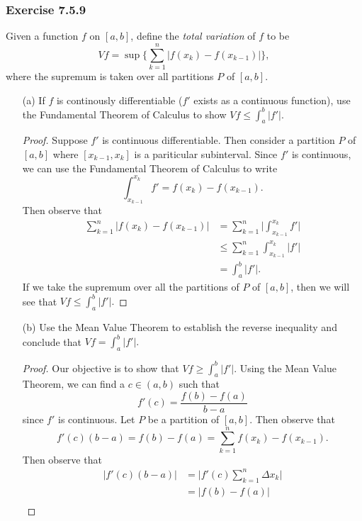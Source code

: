 \subsubsection{Exercise 7.5.9} Given a function \( f  \) on \( [a,b]  \), define the \textit{total variation} of \( f  \) to be 
\[  Vf = \sup \Bigg\{ \sum_{ k=1 }^{ n } | f(x_{k}) - f(x_{k-1}) |  \Bigg\},  \]
where the supremum is taken over all partitions \( P  \) of \( [a,b] \).
\begin{enumerate}
    \item[(a)] If \( f  \) is continously differentiable (\( f' \) exists as a continuous function), use the Fundamental Theorem of Calculus to show \( Vf \leq \int_{ a }^{ b } | f' |  \).
		\begin{proof}
			Suppose \( f' \) is continuous differentiable. Then consider a partition \( P  \) of \( [a,b]  \) where \( [x_{k-1}, x_{k }] \) is a pariticular subinterval. Since \( f'  \) is continuous, we can use the Fundamental Theorem of Calculus to write 
			\[  \int_{ x_{k-1} }^{ x_{k } }  f'   = f(x_{k}) - f(x_{k-1}). \]
			Then observe that 
			\begin{align*}
				\sum_{ k=1 }^{ n } | f(x_{k}) - f(x_{k -1})  | &= \sum_{ k=1 }^{ n } \Bigg|  \int_{ x_{k-1} }^{ x_{k }  }  f' \Bigg|     \\
															   &\leq \sum_{ k=1 }^{ n }\int_{ x_{k-1} }^{x_{k } } | f' |   \\
															   &= \int_{ a }^{ b } | f' |.
			\end{align*}
			If we take the supremum over all the partitions of \( P  \) of \( [a,b]  \), then we will see that \( Vf \leq \int_{ a }^{ b } | f' |. \)
		\end{proof}
	\item[(b)] Use the Mean Value Theorem to establish the reverse inequality and conclude that \( Vf = \int_{ a }^{ b } | f' |. \)
		\begin{proof}
		Our objective is to show that \( Vf \geq \int_{ a }^{ b } | f' | \). Using the Mean Value Theorem, we can find a \( c \in (a,b)  \) such that
		\[  f'(c) = \frac{ f(b) - f(a) }{ b -a  }   \]
		since \( f'  \) is continuous. Let \( P  \) be a partition of \( [a,b]  \). Then observe that  
		\[  f'(c) (b-a ) = f(b) - f(a) = \sum_{ k=1 }^{ n } f(x_{ k }) - f(x_{k-1}) . \]
		Then observe that 
		\begin{align*}
		    | f'(c) (b-a) |  &= \Big| f'(c) \sum_{ k=1 }^{ n } \Delta x_{k } \Big|  \\
							 &= | f(b) - f(a) |  \\

\end{align*}
\end{proof}
\end{enumerate}
